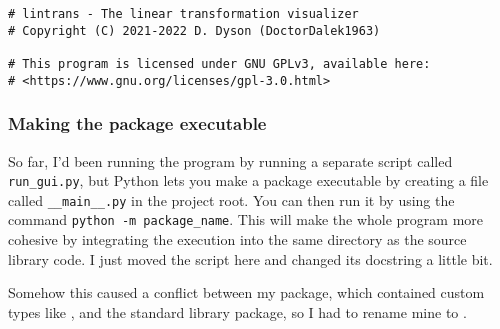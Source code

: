 \documentclass[../development.tex]{subfiles}
\begin{document}
\begin{verbatim}
# lintrans - The linear transformation visualizer
# Copyright (C) 2021-2022 D. Dyson (DoctorDalek1963)

# This program is licensed under GNU GPLv3, available here:
# <https://www.gnu.org/licenses/gpl-3.0.html>
\end{verbatim}

\subsubsection{Making the package executable\label{development:fumbling-with-semver:making-the-package-executable}}

So far, I'd been running the program by running a separate script called \texttt{run\_gui.py}, but Python lets you make a package executable by creating a file called \texttt{\_\_main\_\_.py} in the project root. You can then run it by using the command \texttt{python -m package_name}. This will make the whole program more cohesive by integrating the execution into the same directory as the source library code. I just moved the script here and changed its docstring a little bit.


Somehow this caused a conflict between my  package, which contained custom types like , and the standard library  package, so I had to rename mine to .
\end{document}
